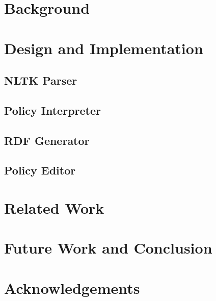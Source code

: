 \documentclass{llncs}
\begin{document}

\section{Background} \label{background}


\section{Design and Implementation} \label{design}


\subsection{NLTK Parser}


\subsection{Policy Interpreter}


\subsection{RDF Generator}


\subsection{Policy Editor}


\section{Related Work}					\label{related}



\section{Future Work and Conclusion} \label{conclusion}


\section*{Acknowledgements}




\end{document}
